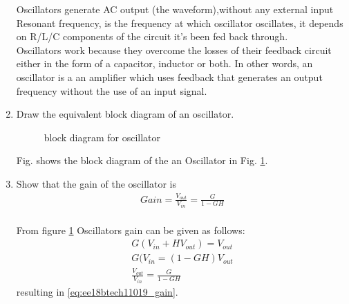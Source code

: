 \begin{enumerate}[label=\thesection.\arabic*.,ref=\thesection.\theenumi]

Oscillators generate AC output (the waveform),without any external input \\
Resonant frequency, is the frequency at which oscillator oscillates, it depends on R/L/C components of the circuit it's been fed back through.\\
Oscillators work because they overcome the losses of their feedback circuit either in the form of a capacitor, inductor or both. In other words, an oscillator is a an amplifier which uses feedback that generates an output frequency without the use of an input signal.\\ %
\newline

\item Draw the equivalent block diagram of an oscillator.\\
\solution
\begin{figure}[!ht]
    \begin{center}
		
		\resizebox{\columnwidth}{!}{} %
	\end{center}
\caption{block diagram for oscillator}
\label{fig:ee18btech11019_hart_block}
\end{figure}
Fig. \label{fig:ee18btech11019_hart_block} shows the block diagram of the an Oscillator in Fig. \ref{fig:ee18btech11019_hart_block}.\\




\item Show that the gain of the oscillator is \\
\begin{align}
    Gain  = \frac{V_{out}}{V_{in}} = \frac{G}{1 - GH}
\label{eq:ee18btech11019_gain}
\end{align}
%
\\
\solution From figure \ref{fig:ee18btech11019_hart_block}
Oscillators gain can be given as follows:\\
\begin{align}
    G(V_{in} + HV_{out}) =V_{out}\\
    G(V_{in} = (1-GH)V_{out}\\
    \frac{V_{out}}{V_{in}} = \frac{G}{1 - GH}
\end{align}
%
resulting in \eqref{eq:ee18btech11019_gain}.\\




\end{enumerate}

